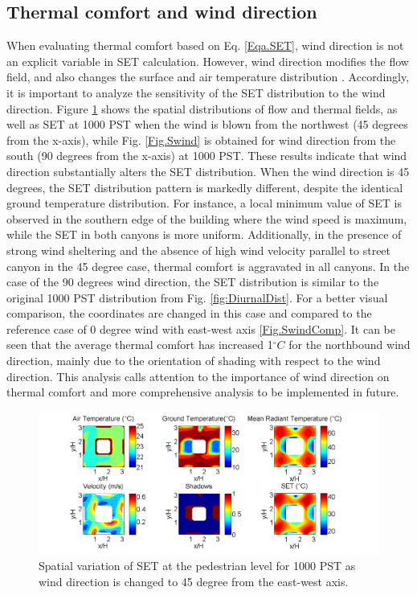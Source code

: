 \documentclass[smallextended]{svjour3}
\newcommand{\degree}{\ensuremath{^\circ}}
\begin{document}
\subsection{Thermal comfort and wind direction}
When evaluating thermal comfort based on Eq. \ref{Eqa.SET}, wind direction is not an explicit variable in SET calculation. However,  wind direction modifies the flow field, and also changes the surface and air temperature distribution \citep{nazarian2014effects}. Accordingly, it is important to analyze the sensitivity of the SET distribution to the wind direction. Figure \ref{Fig.NWwind} shows the spatial distributions of flow and thermal fields, as well as SET at 1000 PST when the wind is blown from the northwest (45 degrees from the x-axis), while Fig. \ref{Fig.Swind} is obtained for wind direction from the south (90 degrees from the x-axis) at 1000 PST. These results indicate that wind direction substantially alters the SET distribution. When the wind direction is 45 degrees, the SET distribution pattern is markedly different, despite the identical ground temperature distribution. For instance, a local minimum value of SET is observed in the southern edge of the building where the wind speed is maximum, while the SET in both canyons is more uniform. Additionally, in the presence of strong wind sheltering and the absence of high wind velocity parallel to street canyon in the 45 degree case, thermal comfort is aggravated in all canyons. In the case of the 90 degrees wind direction, the SET distribution is  similar to the original 1000 PST distribution from Fig. \ref{fig:DiurnalDist}. For a better visual comparison, the coordinates are changed in this case and compared to the reference case of 0 degree wind with east-west axis \ref{Fig.SwindComp}. It can be seen that the average thermal comfort has increased 1$\degree C$ for the northbound wind direction, mainly due to the orientation of shading with respect to the wind direction. This analysis calls attention to the importance of wind direction on thermal comfort and more comprehensive analysis to be implemented in future. 
\begin{figure}[!h]
\graphicspath{ {image/} }
\centerline{\includegraphics[width=\textwidth]{Theta45_10AM.png}}    
\caption{Spatial variation of SET at the pedestrian level for 1000 PST as wind direction is changed to 45 degree from the east-west axis.}    
\label{Fig.NWwind}
\end{figure}
\end{document}
